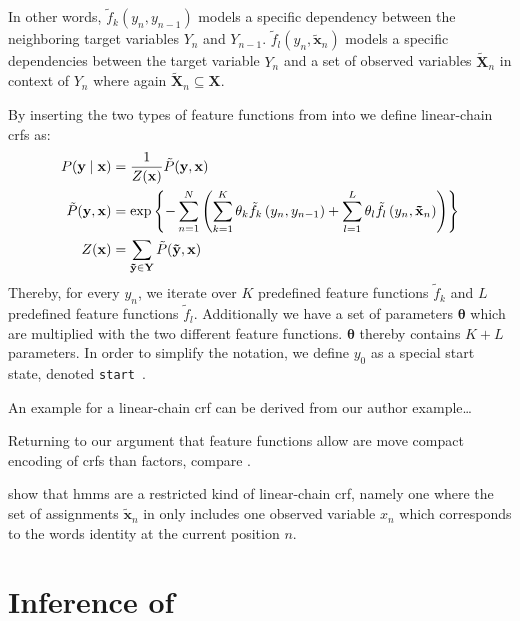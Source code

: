 In other words, $\tilde{f}_k(y_n,y_{n-1})$ models a specific dependency between the neighboring \glspl{target variable} $Y_n$ and $Y_{n-1}$. $\tilde{f}_l(y_n,\mathbf{\tilde{x}}_n)$ models a specific dependencies between the \gls{target variable} $Y_n$ and a set of \glspl{observed variable} $\mathbf{\tilde{X}}_n$ in context of $Y_n$ where again $\mathbf{\tilde{X}}_n\subseteq\mathbf{X}$.

By inserting the two types of \glspl{feature function} from  into  we define \glspl{linear-chain crf} as:
\begin{equation}
  \label{equ:linear-chain-crf-log-linear}
  \begin{split}
    P(\mathbf{y}\mid\mathbf{x}) & = \frac{1}{Z(\mathbf{x})}\tilde{P}(\mathbf{y},\mathbf{x})  \\
    \tilde{P}(\mathbf{y},\mathbf{x}) & = \exp\left\{ -\sum_{n=1}^N \left(\sum_{k=1}^K\theta_k \tilde{f}_k\left(\vphantom{\tilde{x}}y_n,y_{n-1}\right)+\sum_{l=1}^L\theta_l \tilde{f}_l\left(y_n,\mathbf{\tilde{x}}_n\right)\right) \right\} \\
    Z(\mathbf{x}) & = \sum_{\mathbf{\tilde{y}}\in\mathbf{Y}}\tilde{P}(\mathbf{\tilde{y}},\mathbf{x})
  \end{split}
\end{equation}
Thereby, for every $y_n$, we iterate over $K$ predefined \glspl{feature function} $\tilde{f}_k$ and $L$ predefined \glspl{feature function} $\tilde{f}_l$.
Additionally we have a set of parameters $\bm{\theta}$ which are multiplied with the two different feature functions.
$\bm{\theta}$ thereby contains $K+L$ parameters.
In order to simplify the notation, we define $y_0$ as a special start state, denoted \texttt{start}~\citep{lafferty2001conditional}.

An example for a  \gls{linear-chain crf} can be derived from our author example\dots{}

Returning to our argument that \glspl{feature function} allow are move compact encoding of \glspl{crf} than \glspl{factor}, compare .

\citet{sutton2010introduction} show that \glspl{hmm} are a restricted kind of \gls{linear-chain crf}, namely one where the set of assignments $\mathbf{\tilde{x}}_n$ in  only includes one \gls{observed variable} $x_n$ which corresponds to the words identity at the current position $n$.

\section{Inference of }\label{sec:inference-crfs}

